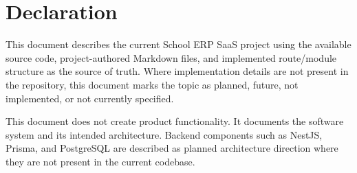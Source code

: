 \chapter*{Declaration}
This document describes the current School ERP SaaS project using the available source code, project-authored Markdown files, and implemented route/module structure as the source of truth. Where implementation details are not present in the repository, this document marks the topic as planned, future, not implemented, or not currently specified.

\begin{warningbox}
This document does not create product functionality. It documents the software system and its intended architecture. Backend components such as NestJS, Prisma, and PostgreSQL are described as planned architecture direction where they are not present in the current codebase.
\end{warningbox}
